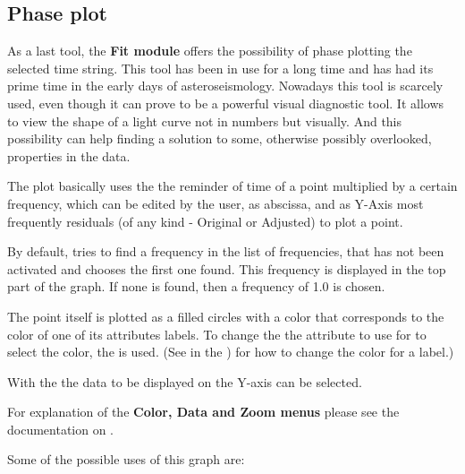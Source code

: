 \subsection{Phase plot}%
\label{period.phase}
As a last tool, the {\bf Fit module} offers the possibility of phase plotting
the selected time string. This tool has been in use for a long time 
and has had its prime time in the early days of asteroseismology. 
Nowadays this tool is scarcely used, even though
it can prove to be a powerful visual diagnostic tool.
It allows to view the shape of a light curve not in numbers 
but visually. And this possibility can help finding a solution to some,
otherwise possibly overlooked, properties in the data.

The plot basically uses the the reminder of time of a point multiplied by a
certain frequency, which can be edited by the user, 
as abscissa, and as Y-Axis most frequently residuals
(of any kind - Original or Adjusted) to plot a point.

By default, \period tries to find a frequency in the list of frequencies, 
that has not been activated and chooses the first one found.
This frequency is displayed in the top part of the graph. 
If none is found, then a frequency of 1.0 is chosen.

The point itself is plotted as a filled circles with a color that
corresponds to the color of one of its attributes labels.
To change the the attribute to use for to select the color,
the  is used. 
(See  in the
) for how to
change the color for a label.)

With the  the data to be displayed on the Y-axis can be selected.

For explanation of the {\bf Color, Data and Zoom menus} please see
the documentation on .

Some of the possible uses of this graph are:


